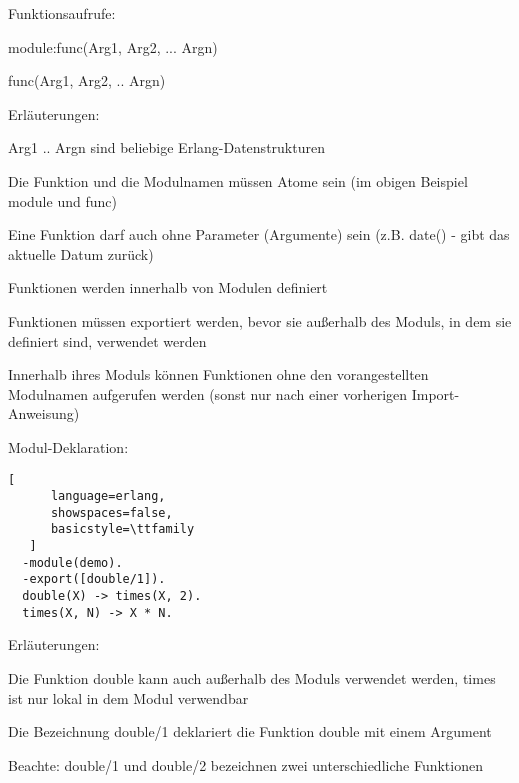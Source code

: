 \documentclass[10pt]{article}
\begin{document}
Funktionsaufrufe:
\begin{itemize*}
  \item module:func(Arg1, Arg2, ... Argn)
  \item func(Arg1, Arg2, .. Argn)
  \item Erläuterungen:
  \begin{itemize*}
    \item Arg1 .. Argn sind beliebige Erlang-Datenstrukturen
    \item Die Funktion und die Modulnamen müssen Atome sein (im obigen Beispiel module und func)
    \item Eine Funktion darf auch ohne Parameter (Argumente) sein (z.B. date() - gibt das aktuelle Datum zurück)
    \item Funktionen werden innerhalb von Modulen definiert
    \item Funktionen müssen exportiert werden, bevor sie außerhalb des Moduls, in dem sie definiert sind, verwendet werden
    \item Innerhalb ihres Moduls können Funktionen ohne den vorangestellten Modulnamen aufgerufen werden (sonst nur nach einer vorherigen Import-Anweisung)
  \end{itemize*}
\end{itemize*}

Modul-Deklaration:
\begin{lstlisting}[
      language=erlang,
      showspaces=false,
      basicstyle=\ttfamily
   ]
  -module(demo).
  -export([double/1]).
  double(X) -> times(X, 2).
  times(X, N) -> X * N.
        \end{lstlisting}
\begin{itemize*}
  \item Erläuterungen:
  \item Die Funktion double kann auch außerhalb des Moduls verwendet werden, times ist nur lokal in dem Modul verwendbar
  \item Die Bezeichnung double/1 deklariert die Funktion double mit einem Argument
  \item Beachte: double/1 und double/2 bezeichnen zwei unterschiedliche Funktionen
\end{itemize*}
\end{document}
